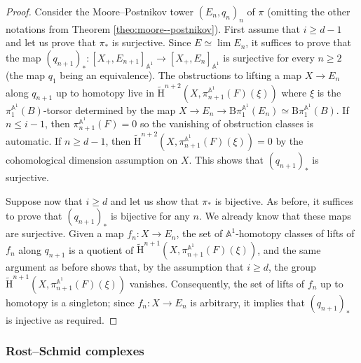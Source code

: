 \documentclass[11pt,leqno]{amsart}
\renewcommand{\1}{{\rm 1\hspace*{-0.4ex}%
\rule{0.1ex}{1.52ex}\hspace*{0.2ex}}}
\newcommand{\Hr}{{\mathrm {H}}}
\newcommand{\<}[1]{{\langle}#1 {\rangle}}
\newcommand{\Abb}{\mathbb{A}}
\newcommand{\Br}{\mathrm{B}}
\theoremstyle{plain}
\theoremstyle{definition}
\theoremstyle{remark}
\numberwithin{equation}{section}
\begin{document}
\begin{proof}
Consider the Moore--Postnikov tower $(E_n,q_n)_n$ of $\pi$ (omitting the other notations from Theorem \ref{theo:moore--postnikov}). First assume that $i\geq d-1$ and let us prove that $\pi_*$ is surjective. Since $E\simeq\lim E_n$, it suffices to prove that the map $(q_{n+1})_*:[X_+,E_{n+1}]_{\Abb^1}\to[X_+,E_n]_{\Abb^1}$ is surjective for every $n\geq 2$ (the map $q_1$ being an equivalence). The obstructions to lifting a map $X\to E_n$ along $q_{n+1}$ up to homotopy live in $\widetilde{\Hr}^{n+2}(X,\pi_{n+1}^{\Abb^1}(F)(\xi))$ where $\xi$ is the $\pi_1^{\Abb^1}(B)$-torsor determined by the map $X\to E_n\to\Br\pi_1^{\Abb^1}(E_n)\simeq\Br\pi_1^{\Abb^1}(B)$. If $n\leq i-1$, then $\pi_{n+1}^{\Abb^1}(F)=0$ so the vanishing of obstruction classes is automatic. If $n\geq d-1$, then $\widetilde{\Hr}^{n+2}(X,\pi_{n+1}^{\Abb^1}(F)(\xi))=0$ by the cohomological dimension assumption on $X$. This shows that $(q_{n+1})_*$ is surjective.

Suppose now that $i\geq d$ and let us show that $\pi_*$ is bijective. As before, it suffices to prove that $(q_{n+1})_*$ is bijective for any $n$. We already know that these maps are surjective. Given a map $f_n:X\to E_n$, the set of $\Abb^1$-homotopy classes of lifts of $f_n$ along $q_{n+1}$ is a quotient of $\widetilde{\Hr}^{n+1}(X,\pi_{n+1}^{\Abb^1}(F)(\xi))$, and the same argument as before shows that, by the assumption that $i\geq d$, the group $\widetilde{\Hr}^{n+1}(X,\pi_{n+1}^{\Abb^1}(F)(\xi))$ vanishes. Consequently, the set of lifts of $f_n$ up to homotopy is a singleton; since $f_n:X\to E_n$ is arbitrary, it implies that $(q_{n+1})_*$ is injective as required.
\end{proof}

\subsubsection*{Rost--Schmid complexes}
\end{document}
